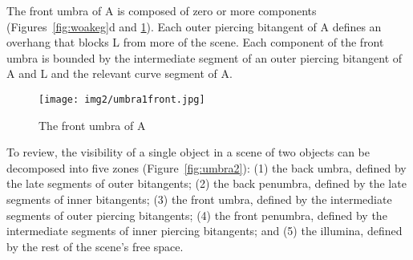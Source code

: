 \documentclass[9pt,twocolumn]{article}
\newif\ifSurrounding    %
\newif\ifJournal
\begin{document}
\ifJournal
\begin{lemma}
Let A and L be smooth closed curves, where neither A nor L surrounds the
other.\footnote{This lemma extends to the surrounding cases with an
	appropriate definition of inner and outer bitangent, as shown in
	Section~\ref{sec:surround}.}
$A$ and $L$ have exactly 2 outer bitangents and 2 inner bitangents.
\end{lemma}
\prf
This lemma relies on the fact that the inner and outer tangents are extremal.
There is an alternative definition of inner and outer bitangents
that has a more intuitive appeal: the inner and outer bitangents of A and B
are the only bitangents of the convex hull of A and the convex hull of B.
That is, compute the convex hull of A and the convex hull of B, then take
bitangents: there are only 4 bitangents (proof?) and these are the inner and
outer bitangents of A and B.
\QED
\fi



The front umbra of A is composed of zero or more components (Figures~\ref{fig:woakeg}d and \ref{fig:frontumbra}).
Each outer piercing bitangent of A 
defines an overhang that blocks L from more of the scene.
Each component of the front umbra is bounded by the intermediate segment of
an outer piercing bitangent of A and L and
the relevant curve segment of A.

\begin{figure}
\begin{center}
\texttt{[image: img2/umbra1front.jpg]}
\end{center}
\caption{The front umbra of A}
\label{fig:frontumbra}
\end{figure}

\ifSurrounding
Figure~\ref{fig:frontsurrounding} illustrates the case when A surrounds L, which follows
the same construction.
\fi


\ifJournal
To review, the visibility of a single object in a scene of two objects
can be decomposed into five zones (Figure~\ref{fig:umbra2}):
(1) the back umbra, defined by the late segments of outer bitangents;
(2) the back penumbra, defined by the late segments of inner bitangents;
(3) the front umbra, defined by the intermediate segments of outer piercing bitangents; 
(4) the front penumbra, defined by the intermediate segments of inner piercing bitangents; and
(5) the illumina, defined by the rest of the scene's free space.
\end{document}
